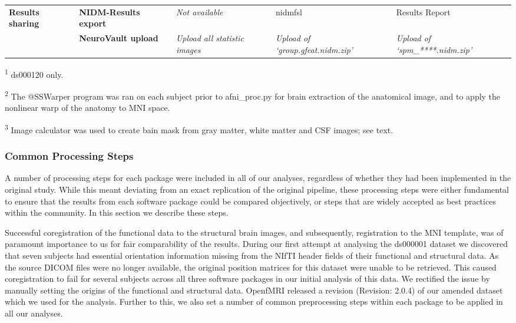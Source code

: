 \begin{onehalfspace}
\begin{table}[htbp]
\begin{threeparttable}
\begin{tabular}{@{}p{}*{4}{L{\tabcolsep\relax}}@{}}
\midrule
\textbf{Results \linebreak sharing} & \textbf{NIDM-Results export} & \textit{Not available} & nidmfsl & Results Report \\
\cmidrule(lr){2-5}
& \textbf{NeuroVault upload} & \textit{Upload all statistic images} & \textit{Upload of `group.gfeat.nidm.zip'} & \textit{Upload of `spm\_****.nidm.zip'}\\
\bottomrule
\end{tabular}
    \begin{tablenotes}
      \small
      \item \textsuperscript{1} ds000120 only.
      \item \textsuperscript{2} The @SSWarper program was ran on each subject prior to afni\_proc.py for brain extraction of the anatomical image, and to apply the nonlinear warp of the anatomy to MNI space.
      \item \textsuperscript{3} Image calculator was used to create bain mask from gray matter, white matter and CSF images; see text. 
    \end{tablenotes}
    \end{threeparttable}
\end{table}
\end{onehalfspace}

\subsubsection{Common Processing Steps}
A number of processing steps for each package were included in all of our analyses, regardless of whether they had been implemented in the original study. While this meant deviating from an exact replication of the original pipeline, these processing steps were either fundamental to ensure that the results from each software package could be compared objectively, or steps that are widely accepted as best practices within the community. In this section we describe these steps.

Successful coregistration of the functional data to the structural brain images, and subsequently, registration to the MNI template, was of paramount importance to us for fair comparability of the results. During our first attempt at analysing the ds000001 dataset we discovered that seven subjects had essential orientation information missing from the NIfTI header fields of their functional and structural data. As the source DICOM files were no longer available, the original position matrices for this dataset were unable to be retrieved. This caused coregistration to fail for several subjects across all three software packages in our initial analysis of this data. We rectified the issue by manually setting the origins of the functional and structural data. OpenfMRI released a revision (Revision: 2.0.4) of our amended dataset which we used for the analysis. Further to this, we also set a number of common preprocessing steps within each package to be applied in all our analyses.   

